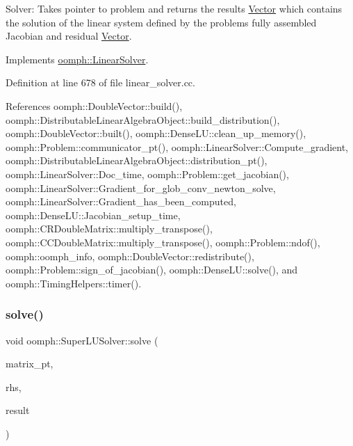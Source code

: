 Solver\+: Takes pointer to problem and returns the results \hyperlink{classoomph_1_1Vector}{Vector} which contains the solution of the linear system defined by the problem\textquotesingle{}s fully assembled Jacobian and residual \hyperlink{classoomph_1_1Vector}{Vector}. 

Implements \hyperlink{classoomph_1_1LinearSolver_a15ce22542b74ed1826ea485edacbeb6e}{oomph\+::\+Linear\+Solver}.



Definition at line 678 of file linear\+\_\+solver.\+cc.



References oomph\+::\+Double\+Vector\+::build(), oomph\+::\+Distributable\+Linear\+Algebra\+Object\+::build\+\_\+distribution(), oomph\+::\+Double\+Vector\+::built(), oomph\+::\+Dense\+L\+U\+::clean\+\_\+up\+\_\+memory(), oomph\+::\+Problem\+::communicator\+\_\+pt(), oomph\+::\+Linear\+Solver\+::\+Compute\+\_\+gradient, oomph\+::\+Distributable\+Linear\+Algebra\+Object\+::distribution\+\_\+pt(), oomph\+::\+Linear\+Solver\+::\+Doc\+\_\+time, oomph\+::\+Problem\+::get\+\_\+jacobian(), oomph\+::\+Linear\+Solver\+::\+Gradient\+\_\+for\+\_\+glob\+\_\+conv\+\_\+newton\+\_\+solve, oomph\+::\+Linear\+Solver\+::\+Gradient\+\_\+has\+\_\+been\+\_\+computed, oomph\+::\+Dense\+L\+U\+::\+Jacobian\+\_\+setup\+\_\+time, oomph\+::\+C\+R\+Double\+Matrix\+::multiply\+\_\+transpose(), oomph\+::\+C\+C\+Double\+Matrix\+::multiply\+\_\+transpose(), oomph\+::\+Problem\+::ndof(), oomph\+::oomph\+\_\+info, oomph\+::\+Double\+Vector\+::redistribute(), oomph\+::\+Problem\+::sign\+\_\+of\+\_\+jacobian(), oomph\+::\+Dense\+L\+U\+::solve(), and oomph\+::\+Timing\+Helpers\+::timer().

\mbox{\label{classoomph_1_1SuperLUSolver_a94e94a44f4cb93f2adf035e9b99990e7}} 
\subsubsection{\texorpdfstring{solve()}{solve()}\hspace{0.1cm}{\footnotesize\ttfamily [2/2]}}
{\footnotesize\ttfamily void oomph\+::\+Super\+L\+U\+Solver\+::solve (\begin{DoxyParamCaption}\item[{\hyperlink{classoomph_1_1DoubleMatrixBase}{Double\+Matrix\+Base} $\ast$const \&}]{matrix\+\_\+pt,  }\item[{const \hyperlink{classoomph_1_1DoubleVector}{Double\+Vector} \&}]{rhs,  }\item[{\hyperlink{classoomph_1_1DoubleVector}{Double\+Vector} \&}]{result }\end{DoxyParamCaption})\hspace{0.3cm}{\ttfamily [virtual]}}



